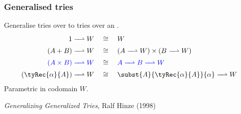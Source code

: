 \begin{frame}
\frametitle{Generalised tries}

Generalise tries over  to tries over an .
\begin{align*}
1 \toFin W
&\quad\cong\quad
W
\\
(A + B) \toFin W
&\quad\cong\quad
(A \toFin W) \times (B \toFin W)
\\
\textcolor{blue}{(A \times B) \toFin W}
&\quad\cong\quad
\textcolor{blue}{A \toFin B \toFin W}
\\
(\tyRec{\alpha}{A}) \toFin W
&\quad\cong\quad
\subst{A}{\tyRec{\alpha}{A}}{\alpha} \toFin W
\end{align*}
Parametric in codomain $W$.

\vspace{10pt}
\emph{Generalizing Generalized Tries}, Ralf Hinze (1998)
\end{frame}
